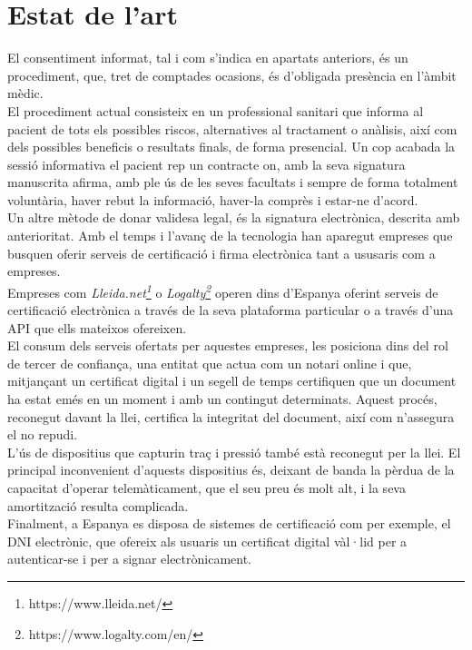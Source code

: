 \section{Estat de l'art}
El consentiment informat, tal i com s'indica en apartats anteriors, és un procediment, que, tret de comptades ocasions, és d'obligada presència en l'àmbit mèdic.\\
\newline El procediment actual consisteix en un professional sanitari que informa al pacient de tots els possibles riscos, alternatives al tractament o anàlisis, així com dels possibles beneficis o resultats finals, de forma presencial. Un cop acabada la sessió informativa el pacient rep un contracte on, amb la seva signatura manuscrita afirma, amb ple ús de les seves facultats i sempre de forma totalment voluntària, haver rebut la informació, haver-la comprès i estar-ne d'acord.\\
\newline Un altre mètode de donar validesa legal, és la signatura electrònica, descrita amb anterioritat. Amb el temps i l'avanç de la tecnologia han aparegut empreses que busquen oferir serveis de certificació i firma electrònica tant a ususaris com a empreses.\\
\newline Empreses com \textit{Lleida.net\footnote{https://www.lleida.net/}} o \textit{Logalty\footnote{https://www.logalty.com/en/}} operen dins d'Espanya oferint serveis de certificació electrònica a través de la seva plataforma particular o a través d'una API que ells mateixos ofereixen.\\
\newline El consum dels serveis ofertats per aquestes empreses, les posiciona dins del rol de tercer de confiança, una entitat que actua com un notari online i que, mitjançant un certificat digital i un segell de temps certifiquen que un document ha estat emés en un moment i amb un contingut determinats. 
\newline Aquest procés, reconegut davant la llei, certifica la integritat del document, així com n'assegura el no repudi.\\
\newline L'ús de dispositius que capturin traç i pressió també està reconegut per la llei. El principal inconvenient d'aquests dispositius és, deixant de banda la pèrdua de la capacitat d'operar telemàticament, que el seu preu és molt alt, i la seva amortització resulta complicada.\\
\newline Finalment, a Espanya es disposa de sistemes de certificació com per exemple, el DNI electrònic, que ofereix als usuaris un certificat digital vàl·lid per a autenticar-se i per a signar electrònicament.
